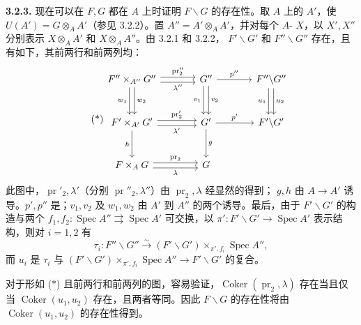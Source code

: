\textbf{3.2.3.} 现在可以在 $F,G$ 都在 $A$ 上时证明 $F\backslash G$ 的存在性。取 $A$ 上的 $A'$，使 $U(A')=G\otimes_A A'$（参见 3.2.2）。置 $A''=A'\otimes_A A'$，并对每个 $A$- $X$，以 $X',X''$ 分别表示 $X\otimes_A A'$ 和 $X\otimes_A A''$。由 3.2.1 和 3.2.2， $F'\backslash G'$ 和 $F''\backslash G''$ 存在，且有如下，其前两行和前两列均：
\[
\tag{*}
\begin{tikzcd}[column sep=large,row sep=large]
F''\times_{A''}G''\arrow[r,shift left=.6ex,"\operatorname{pr}''_2"]\arrow[r,shift right=.6ex,"\lambda''"']\arrow[d,shift left=.6ex,"w_2"]\arrow[d,shift right=.6ex,"w_1"']&G''\arrow[r,"p''"]\arrow[d,shift left=.6ex,"v_2"]\arrow[d,shift right=.6ex,"v_1"']&F''\backslash G''\arrow[d,shift left=.6ex,"u_2"]\arrow[d,shift right=.6ex,"u_1"']\\
F'\times_{A'}G'\arrow[r,shift left=.6ex,"\operatorname{pr}'_2"]\arrow[r,shift right=.6ex,"\lambda'"']\arrow[d,"h"']&G'\arrow[r,"p'"]\arrow[d,"g"]&F'\backslash G'\\
F\times_A G\arrow[r,shift left=.6ex,"\operatorname{pr}_2"]\arrow[r,shift right=.6ex,"\lambda"']&G&
\end{tikzcd}
\]
此图中，$\operatorname{pr}'_2,\lambda'$（分别 $\operatorname{pr}''_2,\lambda''$）由 $\operatorname{pr}_2,\lambda$ 经显然的得到； $g,h$ 由 $A\to A'$ 诱导。$p',p''$ 是；$v_1,v_2$ 及 $w_1,w_2$ 由 $A'$ 到 $A''$ 的两个诱导。最后，由于 $F'\backslash G'$ 的构造与两个 $f_1,f_2:\operatorname{Spec}A''\rightrightarrows\operatorname{Spec}A'$ 可交换，以 $\pi':F'\backslash G'\to\operatorname{Spec}A'$ 表示结构，则对 $i=1,2$ 有
\[
\tau_i:F''\backslash G''\xrightarrow{\sim}(F'\backslash G')\times_{\pi',f_i}\operatorname{Spec}A'',
\]
而 $u_i$ 是 $\tau_i$ 与 $(F'\backslash G')\times_{\pi',f_i}\operatorname{Spec}A''\to F'\backslash G'$ 的复合。

对于形如 ($*$) 且前两行和前两列的图，容易验证，$\operatorname{Coker}(\operatorname{pr}_2,\lambda)$ 存在当且仅当 $\operatorname{Coker}(u_1,u_2)$ 存在，且两者等同。因此 $F\backslash G$ 的存在性将由 $\operatorname{Coker}(u_1,u_2)$ 的存在性得到。


